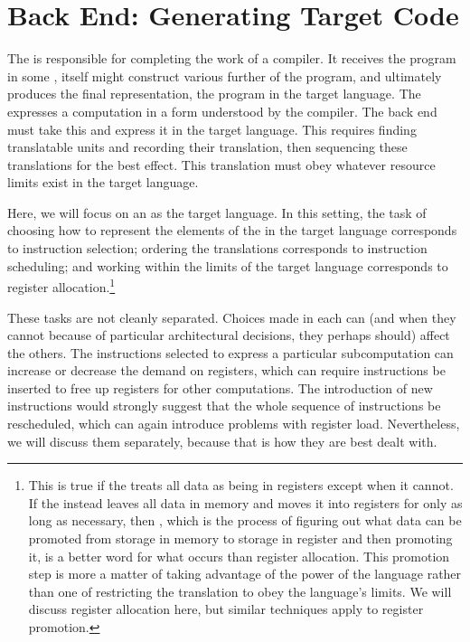 \section{Back End: Generating Target Code}
The  is responsible for completing the work of a compiler. It receives the program in some \IR{}, itself might construct various further \IRs of the program, and ultimately produces the final representation, the program in the target language. The \IR expresses a computation in a form understood by the compiler. The back end must take this and express it in the target language. This requires finding translatable units and recording their translation, then sequencing these translations for the best effect. This translation must obey whatever resource limits exist in the target language.

Here, we will focus on an \ISL as the target language. In this setting, the task of choosing how to represent the elements of the \IR in the target language corresponds to instruction selection; ordering the translations corresponds to instruction scheduling; and working within the limits of the target language corresponds to register allocation.\footnote{This is true if the \IR treats all data as being in registers except when it cannot. If the \IR instead leaves all data in memory and moves it into registers for only as long as necessary, then , which is the process of figuring out what data can be promoted from storage in memory to storage in register and then promoting it, is a better word for what occurs than register allocation. This promotion step is more a matter of taking advantage of the power of the language rather than one of restricting the translation to obey the language's limits. We will discuss register allocation here, but similar techniques apply to register promotion.}

These tasks are not cleanly separated. Choices made in each can (and when they cannot because of particular architectural decisions, they perhaps should) affect the others. The instructions selected to express a particular subcomputation can increase or decrease the demand on registers, which can require instructions be inserted to free up registers for other computations. The introduction of new instructions would strongly suggest that the whole sequence of instructions be rescheduled, which can again introduce problems with register load. Nevertheless, we will discuss them separately, because that is how they are best dealt with.

